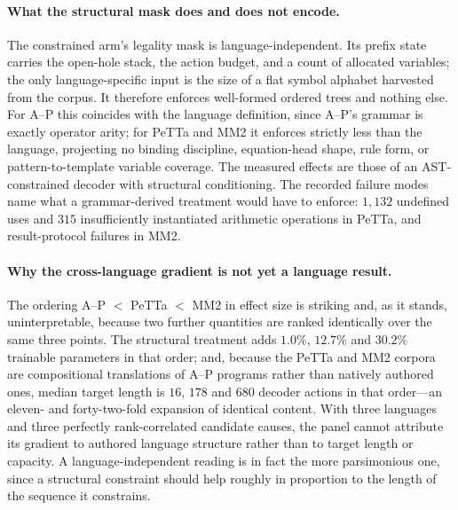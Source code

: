 \documentclass[11pt]{article}
\begin{document}
\paragraph{What the structural mask does and does not encode.}
The constrained arm's legality mask is language-independent.  Its prefix state carries
the open-hole stack, the action budget, and a count of allocated variables; the only
language-specific input is the size of a flat symbol alphabet harvested from the corpus.
It therefore enforces well-formed ordered trees and nothing else.  For A--P this
coincides with the language definition, since A--P's grammar is exactly operator arity;
for PeTTa and MM2 it enforces strictly less than the language, projecting no binding
discipline, equation-head shape, rule form, or pattern-to-template variable coverage.
The measured effects are those of an AST-constrained decoder with structural
conditioning.  The recorded failure modes name what a grammar-derived treatment would
have to enforce: $1{,}132$ undefined uses and $315$ insufficiently instantiated
arithmetic operations in PeTTa, and result-protocol failures in MM2.

\paragraph{Why the cross-language gradient is not yet a language result.}
The ordering A--P $<$ PeTTa $<$ MM2 in effect size is striking and, as it stands,
uninterpretable, because two further quantities are ranked identically over the same
three points.  The structural treatment adds $1.0\%$, $12.7\%$ and $30.2\%$ trainable
parameters in that order; and, because the PeTTa and MM2 corpora are compositional
translations of A--P programs rather than natively authored ones, median target length is
$16$, $178$ and $680$ decoder actions in that order---an eleven- and forty-two-fold
expansion of identical content.  With three languages and three perfectly rank-correlated
candidate causes, the panel cannot attribute its gradient to authored language structure
rather than to target length or capacity.  A language-independent reading is in fact the
more parsimonious one, since a structural constraint should help roughly in proportion to
the length of the sequence it constrains.
\end{document}
